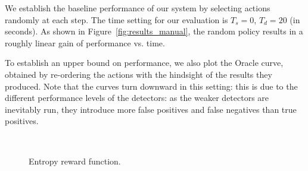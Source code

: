 We establish the baseline performance of our system by selecting actions randomly at each step.
The time setting for our evaluation is $T_s=0$, $T_d=20$ (in seconds).
As shown in Figure~\ref{fig:results_manual}, the random policy results in a roughly linear gain of performance vs. time.

To establish an upper bound on performance, we also plot the Oracle curve, obtained by re-ordering the actions with the hindsight of the results they produced.
Note that the curves turn downward in this setting: this is due to the different performance levels of the detectors: as the weaker detectors are inevitably run, they introduce more false positives and false negatives than true positives.



\begin{figure}[h!]
\centering
{} \\
  \caption{Entropy reward function.}
  \label{fig:results_entropy}
\end{figure}

